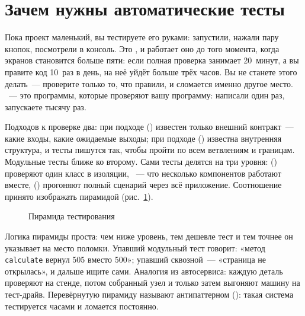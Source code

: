 \section{Зачем нужны автоматические тесты}

Пока проект маленький, вы тестируете его руками: запустили, нажали пару кнопок, посмотрели в консоль. Это , и работает оно до того момента, когда экранов становится больше пяти: если полная проверка занимает 20~минут, а вы правите код 10~раз в день, на неё уйдёт больше трёх часов. Вы не станете этого делать~--- проверите только то, что правили, и сломается именно другое место. ~--- это программы, которые проверяют вашу программу: написали один раз, запускаете тысячу раз.

Подходов к проверке два: при подходе  () известен только внешний контракт~--- какие входы, какие ожидаемые выходы; при подходе  () известна внутренняя структура, и тесты пишутся так, чтобы пройти по всем ветвлениям и границам. Модульные тесты ближе ко второму. Сами тесты делятся на три уровня:  () проверяют один класс в изоляции, ~--- что несколько компонентов работают вместе,  () прогоняют полный сценарий через всё приложение. Соотношение принято изображать пирамидой (рис.~\ref{fig:10-1}).

\begin{figure}[htbp]\centering
{}
\caption{Пирамида тестирования}\label{fig:10-1}
\end{figure}

Логика пирамиды проста: чем ниже уровень, тем дешевле тест и тем точнее он указывает на место поломки. Упавший модульный тест говорит: «метод \texttt{calculate} вернул 505 вместо 500»; упавший сквозной~--- «страница не открылась», и дальше ищите сами. Аналогия из автосервиса: каждую деталь проверяют на стенде, потом собранный узел и только затем выгоняют машину на тест-драйв. Перевёрнутую пирамиду называют антипаттерном  (): такая система тестируется часами и ломается постоянно.


